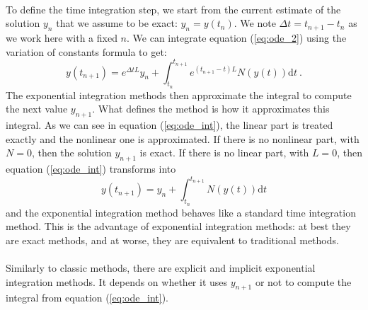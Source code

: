     \paragraph{}
    To define the time integration step, we start from the current estimate of the solution $y_n$ that we assume to be exact: $y_n = y\left(t_n\right)$.
    We note $\Delta t = t_{n+1} - t_n$ as we work here with a fixed $n$.
    We can integrate equation (\ref{eq:ode_2}) using the variation of constants formula to get:
    \begin{equation}\label{eq:ode_int}
      y\left(t_{n+1}\right) = e^{\Delta t L} y_n + \int_{t_n}^{t_{n+1}} e^{\left(t_{n+1} - t\right) L} N\left(y\left(t\right)\right) \mathrm{d}t \ .
    \end{equation}
    The exponential integration methods then approximate the integral to compute the next value $y_{n+1}$.
    What defines the method is how it approximates this integral.
    As we can see in equation (\ref{eq:ode_int}), the linear part is treated exactly and the nonlinear one is approximated.
    If there is no nonlinear part, with $N = 0$, then the solution $y_{n+1}$ is exact.
    If there is no linear part, with $L = 0$, then equation (\ref{eq:ode_int}) transforms into
    \begin{equation}\label{eq:ode_int_classic}
      y\left(t_{n+1}\right) = y_n + \int_{t_n}^{t_{n+1}} N\left(y\left(t\right)\right) \mathrm{d}t
    \end{equation}
    and the exponential integration method behaves like a standard time integration method.
    This is the advantage of exponential integration methods: at best they are exact methods, and at worse, they are equivalent to traditional methods.

    \paragraph{}
    Similarly to classic methods, there are explicit \cite{BhattKhaliqWade2018} and implicit \cite{NieZhangZhao2006} exponential integration methods.
    It depends on whether it uses $y_{n+1}$ or not to compute the integral from equation (\ref{eq:ode_int}).

